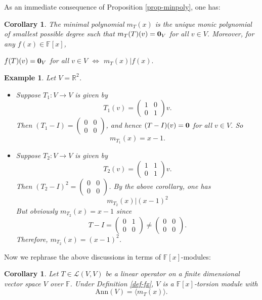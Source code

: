 \documentclass[12pt]{amsbook}
\newtheorem{corollary}[theorem]{Corollary}
\newtheorem{example}[theorem]{Example}
\begin{document}
As an immediate consequence of Proposition \ref{prop-minpoly}, one has:
\begin{corollary}
    The minimal polynomial $m_T(x)$ is the unique monic polynomial of smallest possible degree such that $m_T(T)(v) = {\bf 0}_V$ for all $v \in V$. Moreover, for any $f(x) \in \mathbb{F}[x]$,
    \begin{center}
    $f(T)(v) = {\bf 0}_V$ for all $v \in V$ \quad $\Leftrightarrow$ \quad
    $m_T(x) | f(x).$    
    \end{center}
    
\end{corollary}

\begin{example} \label{eg-2x2}
Let $V = \mathbb{R}^2$.
\begin{itemize}
    \item[(a)] Suppose $T_1: V \to V$ is given by 
    $$T_1(v) = \begin{pmatrix} 1 & 0 \\ 0 & 1 \end{pmatrix}v.$$ 
    Then
$(T_1 - I) = \begin{pmatrix} 0 & 0 \\ 0 & 0 \end{pmatrix}$, and hence $(T-I)(v) = {\bf 0}$
for all $v \in V$. So 
$$m_{T_1}(x) = x-1.$$
\item[(b)]   Suppose $T_2: V \to V$ is given by 
$$T_2(v) = \begin{pmatrix} 1 & 1 \\ 0 & 1 \end{pmatrix}v.$$ Then
$(T_2 - I)^2 = \begin{pmatrix} 0 & 0 \\ 0 & 0 \end{pmatrix}$. By the above corollary, one has
$$m_{T_2}(x) |  (x-1)^2$$
But obviously $m_{T_2}(x) = x-1$ since
$$T-I = \begin{pmatrix} 0 & 1 \\ 0 & 0 \end{pmatrix} \neq \begin{pmatrix} 0 & 0 \\ 0 & 0 \end{pmatrix}.$$
Therefore, $m_{T_2}(x) = (x-1)^2$.
\end{itemize}
\end{example}

Now we rephrase the above discussions in terms of $\mathbb{F}[x]$-modules:
\begin{corollary}
     Let $T \in \mathcal{L}(V,V)$ be a linear operator on a finite dimensional vector space $V$ over $\mathbb{F}$. Under Definition \ref{def-fx}, 
     $V$ is a $\mathbb{F}[x]$-torsion module with
     $$\mathrm{Ann}(V) = \langle m_T(x) \rangle.$$
\end{corollary}
\end{document}
